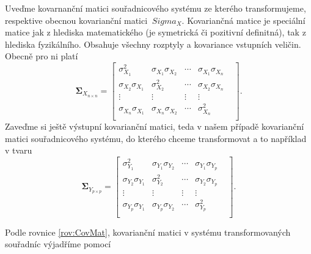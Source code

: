 \documentclass[11pt,a4paper]{article}
\begin{document}
Uveďme kovarnanční matici souřadnicového systému ze kterého transformujeme, respektive obecnou kovarianční matici $ \ Sigma_ {X} $. Kovariančná matice je speciální matice jak z hlediska matematického (je symetrická či pozitivní definitná), tak z hlediska fyzikálního. Obsahuje všechny rozptyly a kovariance vstupních veličin. Obecně pro ni platí
\begin{equation}
\mathbf{\Sigma}_{X_{n\times n}} = 
\begin{bmatrix}
\sigma_{X_{1}}^{2} & \sigma_{X_{1}}\sigma_{X_{2}} & \cdots & \sigma_{X_{1}}\sigma_{X_{n}}\\
\sigma_{X_{2}}\sigma_{X_{1}} & \sigma_{X_{2}}^{2} &  \cdots & \sigma_{X_{2}}\sigma_{X_{n}}\\
\vdots & \vdots & \vdots & \vdots \\
\sigma_{X_{n}}\sigma_{X_{1}} & \sigma_{X_{n}}\sigma_{X_{2}} & \cdots & \sigma_{X_{n}}^{2} & \\
\end{bmatrix}.
\end{equation}
Zaveďme si ještě výstupní kovarianční matici, teda v našem případě kovarianční matici souřadnicového systému, do kterého chceme transformovat a to například v tvaru
\begin{equation}
\mathbf{\Sigma}_{Y_{p\times p}} = 
\begin{bmatrix}
\sigma_{Y_{1}}^{2} & \sigma_{Y_{1}}\sigma_{Y_{2}} & \cdots & \sigma_{Y_{1}}\sigma_{Y_{p}}\\
\sigma_{Y_{2}}\sigma_{Y_{1}} & \sigma_{Y_{2}}^{2} &  \cdots & \sigma_{Y_{2}}\sigma_{Y_{p}}\\
\vdots & \vdots & \vdots & \vdots \\
\sigma_{Y_{p}}\sigma_{Y_{1}} & \sigma_{Y_{p}}\sigma_{Y_{2}} & \cdots & \sigma_{Y_{p}}^{2} & \\
\end{bmatrix}.
\end{equation}

Podle rovnice \ref{rov:CovMat}, kovarianční matici v systému transformovaných souřadníc výjadříme pomocí
\end{document}
